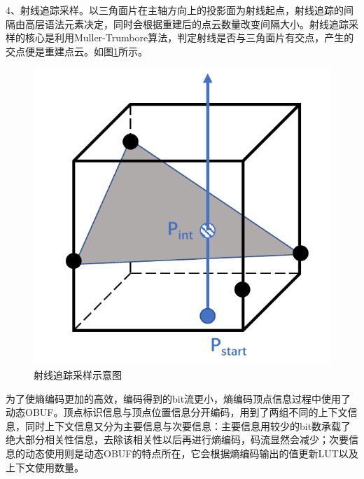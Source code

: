 \documentclass[bachelor,print,msfonts]{xduthesis}
\begin{document}
4、射线追踪采样。以三角面片在主轴方向上的投影面为射线起点，射线追踪的间隔由高层语法元素决定，同时会根据重建后的点云数量改变间隔大小。射线追踪采样的核心是利用Muller-Trumbore算法\cite{ref22}，判定射线是否与三角面片有交点，产生的交点便是重建点云。如图\ref{fig:射线追踪采样}所示。
\begin{figure}[htbp]
    \centering
    \includegraphics[scale=0.5]{image/射线追踪v2.pdf}
    \caption{射线追踪采样示意图}
    \label{fig:射线追踪采样}
\end{figure}

为了使熵编码更加的高效，编码得到的bit流更小，熵编码顶点信息过程中使用了动态OBUF。顶点标识信息与顶点位置信息分开编码，用到了两组不同的上下文信息，同时上下文信息又分为主要信息与次要信息：主要信息用较少的bit数承载了绝大部分相关性信息，去除该相关性以后再进行熵编码，码流显然会减少；次要信息的动态使用则是动态OBUF的特点所在，它会根据熵编码输出的值更新LUT以及上下文使用数量。
\end{document}
